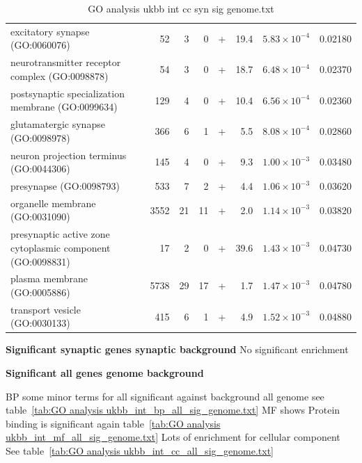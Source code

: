 \begin{table}[ht]
\begin{adjustbox}{width=\textwidth}
\begin{tabular}{lrrrlrrr}
  excitatory synapse (GO:0060076) & 52 & 3 & 0 & + & 19.4 & $5.83 \times 10^{-4}$ & 0.02180 \\ 
  neurotransmitter receptor complex (GO:0098878) & 54 & 3 & 0 & + & 18.7 & $6.48 \times 10^{-4}$ & 0.02370 \\ 
  postsynaptic specialization membrane (GO:0099634) & 129 & 4 & 0 & + & 10.4 & $6.56 \times 10^{-4}$ & 0.02360 \\ 
  glutamatergic synapse (GO:0098978) & 366 & 6 & 1 & + & 5.5 & $8.08 \times 10^{-4}$ & 0.02860 \\ 
  neuron projection terminus (GO:0044306) & 145 & 4 & 0 & + & 9.3 & $1.00 \times 10^{-3}$ & 0.03480 \\ 
  presynapse (GO:0098793) & 533 & 7 & 2 & + & 4.4 & $1.06 \times 10^{-3}$ & 0.03620 \\ 
  organelle membrane (GO:0031090) & 3552 & 21 & 11 & + & 2.0 & $1.14 \times 10^{-3}$ & 0.03820 \\ 
  presynaptic active zone cytoplasmic component (GO:0098831) & 17 & 2 & 0 & + & 39.6 & $1.43 \times 10^{-3}$ & 0.04730 \\ 
  plasma membrane (GO:0005886) & 5738 & 29 & 17 & + & 1.7 & $1.47 \times 10^{-3}$ & 0.04780 \\ 
  transport vesicle (GO:0030133) & 415 & 6 & 1 & + & 4.9 & $1.52 \times 10^{-3}$ & 0.04880 \\ 
   \hline
\end{tabular}
\end{adjustbox}
\caption{GO analysis ukbb int cc syn sig genome.txt} 
\label{tab:GO analysis ukbb_int_cc_syn_sig_genome.txt}
\end{table}


\textbf{Significant synaptic genes synaptic background}
No significant enrichment

\textbf{Significant all genes genome background}

BP some minor terms for all significant against background all genome see table~\ref{tab:GO analysis ukbb_int_bp_all_sig_genome.txt}
MF shows Protein binding is significant again table~\ref{tab:GO analysis ukbb_int_mf_all_sig_genome.txt}
Lots of enrichment for cellular component See table~\ref{tab:GO analysis ukbb_int_cc_all_sig_genome.txt}


